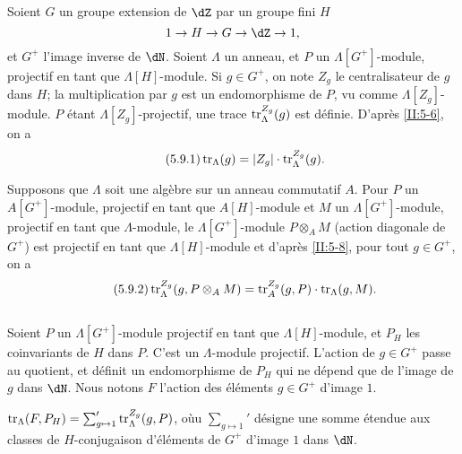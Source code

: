 \subsection{}\label{II:5-9}

Soient $G$ un groupe extension de $\dZ$ par un groupe fini $H$
\[
  1 \to H \to G \to \dZ \to 1 \text{,}
\]
et $G^+$ l'image inverse de $\dN$. Soient $\Lambda$ un anneau, et $P$ un 
$\Lambda[G^+]$-module, projectif en tant que $\Lambda[H]$-module. Si 
$g\in G^+$, on note $Z_g$ le centralisateur de $g$ dans $H$; la multiplication 
par $g$ est un endomorphisme de $P$, vu comme $\Lambda[Z_g]$-module. $P$ étant 
$\Lambda[Z_g]$-projectif, une trace $\operatorname{tr}_\Lambda^{Z_g}(g)$ est définie. 
D'après \ref{II:5-6}, on a 
\begin{equation*}\tag{5.9.1}\label{II:eq:5-9-1}
  \operatorname{tr}_\Lambda(g) = |Z_g| \cdot \operatorname{tr}_\Lambda^{Z_g}(g) \text{.}
\end{equation*}

Supposons que $\Lambda$ soit une algèbre sur un anneau commutatif $A$. Pour 
$P$ un $A[G^+]$-module, projectif en tant que $A[H]$-module et $M$ un 
$\Lambda[G^+]$-module, projectif en tant que $\Lambda$-module, le 
$\Lambda[G^+]$-module $P\otimes_A M$ (action diagonale de $G^+$) est projectif 
en tant que $\Lambda[H]$-module et d'après \ref{II:5-8}, pour tout 
$g\in G^+$, on a 
\begin{equation*}\tag{5.9.2}\label{II:eq:5-9-2}
  \operatorname{tr}_\Lambda^{Z_g}(g,P\otimes_A M) = \operatorname{tr}_A^{Z_g}(g,P) \cdot \operatorname{tr}_\Lambda(g,M) \text{.}
\end{equation*}





\subsection{}\label{II:5-10}

Soient $P$ un $\Lambda[G^+]$-module projectif en tant que $\Lambda[H]$-module, 
et $P_H$ les coinvariants de $H$ dans $P$. C'est un $\Lambda$-module projectif. 
L'action de $g\in G^+$ passe au quotient, et définit un endomorphisme de 
$P_H$ qui ne dépend que de l'image de $g$ dans $\dN$. Nous notons $F$ 
l'action des éléments $g\in G^+$ d'image $1$. 





\begin{proposition_}\label{II:5-11}
$\operatorname{tr}_\Lambda(F,P_H) = \sum_{g\mapsto 1}' \operatorname{tr}_\Lambda^{Z_g}(g,P)$, oùu 
$\sum_{g\mapsto 1}'$ désigne une somme étendue aux classes de 
$H$-conjugaison d'éléments de $G^+$ d'image $1$ dans $\dN$. 
\end{proposition_}


